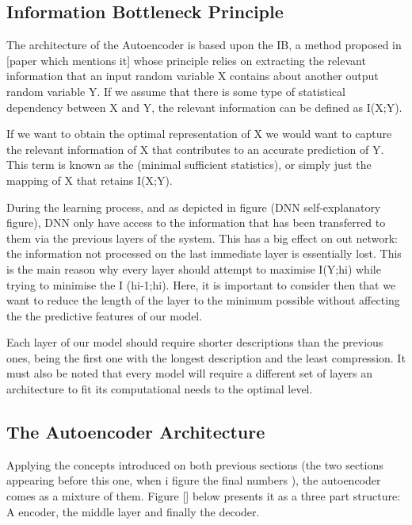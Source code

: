 \subsection{Information Bottleneck Principle}

The architecture of the Autoencoder is based upon the IB, a method proposed in [paper which mentions it] whose principle relies on extracting the relevant information that an input random variable X contains about another output random variable Y. If we assume that there is some type of statistical dependency between X and Y, the relevant information can be defined as I(X;Y).\par

If we want to obtain the optimal representation of X we would want to capture the relevant information of X that contributes to an accurate prediction of Y. This term is known as the (minimal sufficient statistics), or simply just the mapping of X that retains I(X;Y).\par

During the learning process, and as depicted in figure (DNN self-explanatory figure), DNN only have access to the information that has been transferred to them via the previous layers of the system. This has a big effect on out network: the information not processed on the last immediate layer is essentially lost. This is the main reason why every layer should attempt to maximise I(Y;hi) while trying to minimise the I (hi-1;hi). Here, it is important to consider then that we want to reduce the length of the layer to the minimum possible without affecting the the predictive features of our model.

Each layer of our model should require shorter descriptions than the previous ones, being the first one with the longest description and the least compression. It must also be noted that every model will require a different set of layers an architecture to fit its computational needs to the optimal level.

\subsection{The Autoencoder Architecture}

Applying the concepts introduced on both previous sections (the two sections appearing before this one, when  i figure the final numbers ), the autoencoder comes as a mixture of them. Figure [] below presents it as a three part structure: A encoder, the middle layer and finally the decoder. \par

